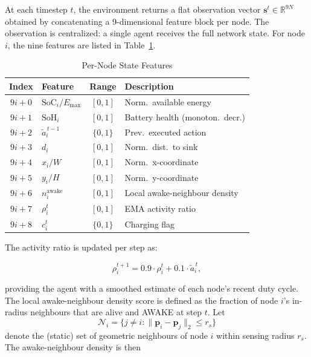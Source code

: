 \documentclass[journal]{IEEEtran}
\begin{document}
At each timestep $t$, the environment returns a flat observation vector
$\mathbf{s}^t \in \mathbb{R}^{9N}$ obtained by concatenating a
9-dimensional feature block per node. The observation is centralized: a
single agent receives the full network state. For node $i$, the nine
features are listed in Table~\ref{tab:features}.

\begin{table}[!t]
\caption{Per-Node State Features\label{tab:features}}
\centering
\footnotesize
\begin{tabular}{clcp{2.4cm}}
\toprule
\textbf{Index} & \textbf{Feature} & \textbf{Range} &
\textbf{Description} \\
\midrule
$9i{+}0$ & $\text{SoC}_i / E_{\max}$    & $[0, 1]$
  & Norm.\ available energy \\
$9i{+}1$ & $\text{SoH}_i$               & $[0, 1]$
  & Battery health (monoton.\ decr.) \\
$9i{+}2$ & $\tilde{a}_i^{\,t-1}$        & $\{0, 1\}$
  & Prev.\ executed action \\
$9i{+}3$ & $d_i$                        & $[0, 1]$
  & Norm.\ dist.\ to sink \\
$9i{+}4$ & $x_i / W$                    & $[0, 1]$
  & Norm.\ x-coordinate \\
$9i{+}5$ & $y_i / H$                    & $[0, 1]$
  & Norm.\ y-coordinate \\
$9i{+}6$ & $n_i^{\text{awake}}$         & $[0, 1]$
  & Local awake-neighbour density \\
$9i{+}7$ & $\rho_i^t$                   & $[0, 1]$
  & EMA activity ratio \\
$9i{+}8$ & $c_i^t$                      & $\{0, 1\}$
  & Charging flag \\
\bottomrule
\end{tabular}
\end{table}

The activity ratio is updated per step as:

\begin{equation}
  \rho_i^{t+1} = 0.9 \cdot \rho_i^t + 0.1 \cdot \tilde{a}_i^{\,t},
  \label{eq:activity}
\end{equation}

providing the agent with a smoothed estimate of each node's recent duty
cycle. The local awake-neighbour density score is defined as the
fraction of node $i$'s in-radius neighbours that are alive and AWAKE
at step $t$. Let
\begin{equation}
  \mathcal{N}_i = \big\{ j \neq i :
  \|\mathbf{p}_i - \mathbf{p}_j\|_2 \leq r_s \big\}
  \label{eq:neighbourhood}
\end{equation}
denote the (static) set of geometric neighbours of node $i$ within
sensing radius $r_s$. The awake-neighbour density is then
\end{document}

